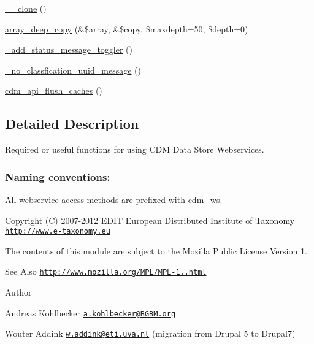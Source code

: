\begin{DoxyCompactItemize}
\hyperlink{cdm__api_8module_ad0cb87b388bc74d63dc884accdca8713}{\-\_\-\-\_\-clone} ()
\item 
\hyperlink{cdm__api_8module_a73c13cbb48e75d4d2e4a8e467292c17a}{array\-\_\-deep\-\_\-copy} (\&\$array, \&\$copy, \$maxdepth=50, \$depth=0)
\item 
\hyperlink{cdm__api_8module_af2c424a33f87b0ae94b9c19182580f62}{\-\_\-add\-\_\-status\-\_\-message\-\_\-toggler} ()
\item 
\hyperlink{cdm__api_8module_a13e1ba2fc96143e8f72e393653af882d}{\-\_\-no\-\_\-classfication\-\_\-uuid\-\_\-message} ()
\item 
\hyperlink{cdm__api_8module_ab703888cb1f40217fb0e044adae6f885}{cdm\-\_\-api\-\_\-flush\-\_\-caches} ()
\end{DoxyCompactItemize}


\subsection{Detailed Description}
Required or useful functions for using C\-D\-M Data Store Webservices.

\subsubsection*{Naming conventions\-:}


\begin{DoxyItemize}
\item All webservice access methods are prefixed with cdm\-\_\-ws.
\end{DoxyItemize}

\begin{DoxyCopyright}{Copyright}
(C) 2007-\/2012 E\-D\-I\-T European Distributed Institute of Taxonomy \href{http://www.e-taxonomy.eu}{\tt http\-://www.\-e-\/taxonomy.\-eu}
\end{DoxyCopyright}
The contents of this module are subject to the Mozilla Public License Version 1.. \begin{DoxySeeAlso}{See Also}
\href{http://www.mozilla.org/MPL/MPL-1.1.html}{\tt http\-://www.\-mozilla.\-org/\-M\-P\-L/\-M\-P\-L-\/1..\-html}
\end{DoxySeeAlso}
\begin{DoxyAuthor}{Author}

\begin{DoxyItemize}
\item Andreas Kohlbecker \href{mailto:a.kohlbecker@BGBM.org}{\tt a.\-kohlbecker@\-B\-G\-B\-M.\-org}
\item Wouter Addink \href{mailto:w.addink@eti.uva.nl}{\tt w.\-addink@eti.\-uva.\-nl} (migration from Drupal 5 to Drupal7) 
\end{DoxyItemize}
\end{DoxyAuthor}


